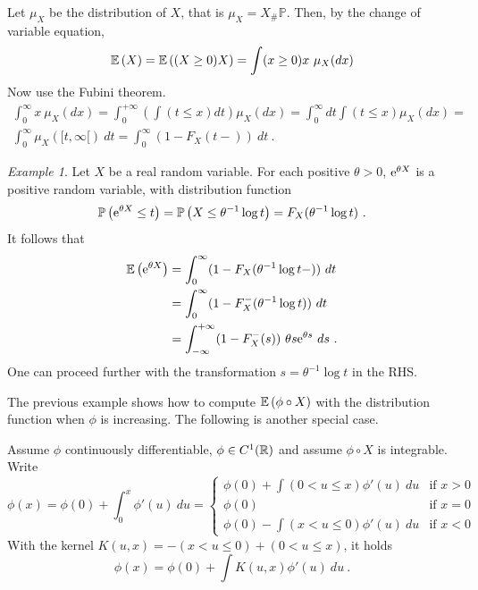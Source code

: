 \documentclass[12pt,a4paper]{amsart}
\theoremstyle{plain}%
\theoremstyle{definition}
\theoremstyle{remark}
\newtheorem{example}{Example}
\begin{document}
Let $\mu_X$ be the distribution of $X$, that is $\mu_X = X_\# \mathbb P$. Then, by the change of variable equation,
\begin{equation*}
  \operatorname{\mathbb E}\left(X\right) = \operatorname{\mathbb E}\left((X \geq 0 )X\right) = \int (x \geq 0) x \ \mu_X(dx)
\end{equation*}
Now use the Fubini theorem.
\begin{multline*}
  \int_0^\infty x \ \mu_X(dx) = \int_0^{+\infty} \left(\int (t \leq x) dt\right) \mu_X(dx) = \int_0^\infty dt \int (t \leq x)  \mu_X(dx) = \\ \int_0^\infty \mu_X([t,\infty[) \ dt = \int_0^\infty (1 - F_X(t-)) \ dt \ .  
\end{multline*}

\begin{example}
Let $X$ be a real random variable. For each positive $\theta > 0$, $\mathrm{e}^{\theta X}$ is a positive random variable, with distribution function
\begin{equation*}
  \operatorname{\mathbb P}\left(\mathrm{e}^{\theta X} \leq t\right) = \operatorname{\mathbb P}\left(X \leq \theta^{-1} \log t\right) = F_X(\theta^{-1} \log t) \ .
\end{equation*}
It follows that
\begin{align*}
  \operatorname{\mathbb E}\left(\mathrm{e}^{\theta X}\right) &= \int_0^\infty (1 - F_X(\theta^{-1} \log t-)) \ dt \\
 &= \int_0^\infty (1 - F_X^-(\theta^{-1} \log t)) \ dt \\
  &= \int_{-\infty}^{+\infty} (1 - F_X^-(s)) \ \theta s \mathrm{e}^{\theta s} \ ds\ . 
\end{align*}
One can proceed further with the transformation $s = \theta^{-1} \log t$ in the RHS.
\end{example}

The previous example shows how to compute $\operatorname{\mathbb E}\left(\phi\circ X\right)$ with the distribution function when $\phi$ is increasing. The following is another special case.

Assume $\phi$ continuously differentiable, $\phi \in C^1(\mathbb{R})$ and assume $\phi\circ X$ is integrable. Write
\begin{equation*}
    \phi(x) = \phi(0) + \int_0^x \phi'(u) \ du = \begin{cases}
      \phi(0) + \int (0 < u \leq x) \phi'(u) \ du & \text{if $x > 0$} \\ \phi(0) & \text{if $x=0$} \\
      \phi(0) - \int (x < u \leq 0) \phi'(u) \ du & \text{if ${x < 0}$}
    \end{cases}
\end{equation*}
With the kernel $K(u,x) = -(x < u \leq 0) + (0 < u \leq x)$, it holds
\begin{equation*}
\phi(x) = \phi(0) + \int K(u,x) \phi'(u) \ du \ .    
\end{equation*}
\end{document}
